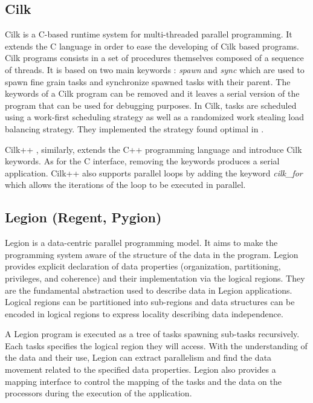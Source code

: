 \subsection{Cilk}
Cilk \cite{BJKLR1995} is a C-based runtime system for multi-threaded parallel programming.
It extends the C language in order to ease the developing of Cilk based programs.
Cilk programs consists in a set of procedures themselves composed of a sequence of threads.
It is based on two main keywords : \textit{spawn} and \textit{sync} which are used to spawn fine grain tasks and synchronize spawned tasks with their parent.
The keywords of a Cilk program can be removed and it leaves a serial version of the program that can be used for debugging purposes.
In Cilk, tasks are scheduled using a work-first scheduling strategy as well as a randomized work stealing load balancing strategy.
They implemented the strategy found optimal in \cite{BlumL1999}.

Cilk++ \cite{Leise2009}, similarly, extends the C++ programming language and introduce Cilk keywords.
As for the C interface, removing the keywords produces a serial application.
Cilk++ also supports parallel loops by adding the keyword \textit{cilk\_for} which allows the iterations of the loop to be executed in parallel.

\subsection{Legion (Regent, Pygion)}
Legion \cite{BaTSA2012} is a data-centric parallel programming model.
It aims to make the programming system aware of the structure of the data in the program.
Legion provides explicit declaration of data properties (organization, partitioning, privileges, and coherence) and their implementation via the logical regions.
They are the fundamental abstraction used to describe data in Legion applications.
Logical regions can be partitioned into sub-regions and data structures can be encoded in logical regions to express locality describing data independence.

A Legion program is executed as a tree of tasks spawning sub-tasks recursively.
Each tasks specifies the logical region they will access.
With the understanding of the data and their use, Legion can extract parallelism and find the data movement related to the specified data properties.
Legion also provides a mapping interface to control the mapping of the tasks and the data on the processors during the execution of the application.


